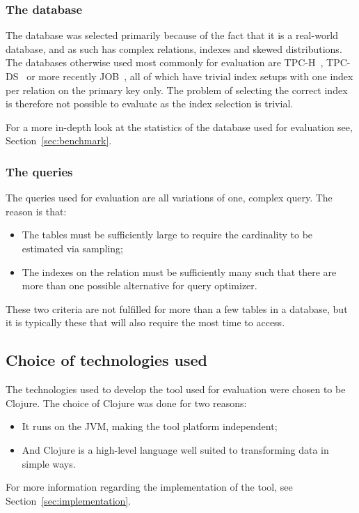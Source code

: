 \subsubsection{The database}
The database was selected primarily because of the fact that it is a real-world
database, and as such has complex relations, indexes and skewed distributions.
The databases otherwise used most commonly for evaluation are
TPC-H~\cite{tpc_th}, TPC-DS~\cite{tpc_tha} or more recently
JOB~\cite{leis_2015_how_hgaqor}, all of which have trivial index setups with
one index per relation on the primary key only. The problem of selecting the
correct index is therefore not possible to evaluate as the index selection is
trivial.

For a more in-depth look at the statistics of the database used for evaluation
see, Section~\ref{sec:benchmark}.

\subsubsection{The queries}
The queries used for evaluation are all variations of one, complex query. The
reason is that:
\begin{itemize}
\item The tables must be sufficiently large to require the cardinality to be
  estimated via sampling;
\item The indexes on the relation must be sufficiently many such that there are
  more than one possible alternative for query optimizer.
\end{itemize}

These two criteria are not fulfilled for more than a few tables in a database,
but it is typically these that will also require the most time to access.

\subsection{Choice of technologies used}
The technologies used to develop the tool used for evaluation were chosen to be
Clojure. The choice of Clojure was done for two reasons:
\begin{itemize}
\item It runs on the JVM, making the tool platform independent;
\item And Clojure is a high-level language well suited to transforming data in
  simple ways.
\end{itemize}

For more information regarding the implementation of the tool, see
Section~\ref{sec:implementation}.

